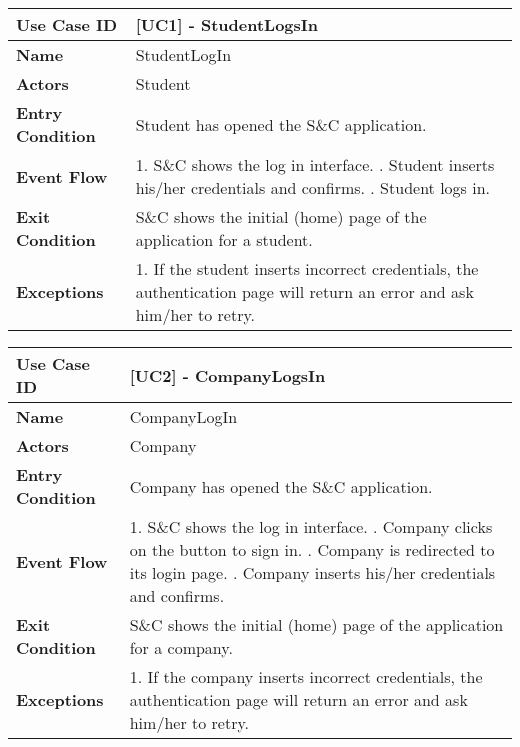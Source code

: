 \begin{table}[H]
    \centering
    \renewcommand{\arraystretch}{2}
    \begin{tabular}{|l|p{10cm}|}
    \hline
    \textbf{Use Case ID} & [UC1] - StudentLogsIn \\ \hline
    \textbf{Name} & StudentLogIn \\ \hline
    \textbf{Actors} & Student \\ \hline
    \textbf{Entry Condition} & Student has opened the S\&C application. \\ \hline
    \textbf{Event Flow} & 
    1. S\&C shows the log in interface. \newline
    2. Student inserts his/her credentials and confirms. \newline
    3. Student logs in. \\ \hline
    \textbf{Exit Condition} & S\&C shows the initial (home) page of the application for a student. \\ \hline
    \textbf{Exceptions} & 
    1. If the student inserts incorrect credentials, the authentication page will return an error and ask him/her to retry. \\ \hline
    \end{tabular}
\end{table}

\newpage

\begin{table}[H]
    \centering
    \renewcommand{\arraystretch}{2}
    \begin{tabular}{|l|p{10cm}|}
    \hline
    \textbf{Use Case ID} & [UC2] - CompanyLogsIn \\ \hline
    \textbf{Name} & CompanyLogIn \\ \hline
    \textbf{Actors} & Company \\ \hline
    \textbf{Entry Condition} & Company has opened the S\&C application. \\ \hline
    \textbf{Event Flow} & 
    1. S\&C shows the log in interface. \newline
    2. Company clicks on the button to sign in. \newline
    3. Company is redirected to its login page. \newline
    4. Company inserts his/her credentials and confirms. \\ \hline
    \textbf{Exit Condition} & S\&C shows the initial (home) page of the application for a company. \\ \hline
    \textbf{Exceptions} & 
    1. If the company inserts incorrect credentials, the authentication page will return an error and ask him/her to retry. \\ \hline
    \end{tabular}
\end{table}

